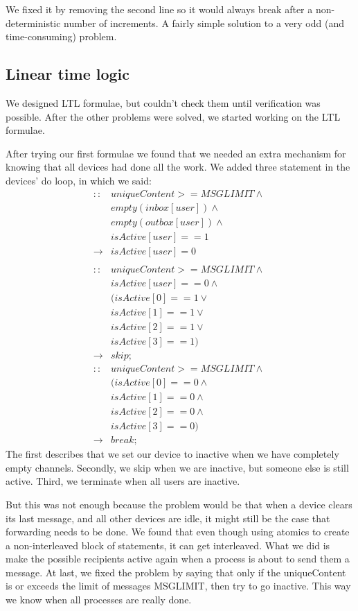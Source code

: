 \documentclass[9pt,a4paper]{article}
\begin{document}
	We fixed it by removing the second line so it would always break after a non-deterministic number of increments. A fairly simple solution to a very odd (and time-consuming) problem.
	
	\subsection{Linear time logic}
	We designed LTL formulae, but couldn't check them until verification was possible.
	After the other problems were solved, we started working on the LTL formulae.
	
	After trying our first formulae we found that we needed an extra mechanism for knowing that all devices had done all the work.
	We added three statement in the devices' do loop, in which we said:
	\begin{align*}
	:: & uniqueContent >= MSGLIMIT \wedge\ \\
	   & empty(inbox[user]) \wedge\ \\
	   & empty(outbox[user]) \wedge\ \\
	   & isActive[user] == 1 \\
	\rightarrow & isActive[user] = 0 \\
	\\
	:: & uniqueContent >= MSGLIMIT \wedge\ \\
	   & isActive[user] == 0  \wedge\ \\ 
	   & (isActive[0] == 1 \vee\ \\ 
	   & isActive[1] == 1 \vee\ \\ 
	   & isActive[2] == 1 \vee\ \\
	   & isActive[3] == 1) \\
	\rightarrow & skip;
	\\
	::  & uniqueContent >= MSGLIMIT \wedge\ \\
	    & (isActive[0] == 0 \wedge\ \\ 
		& isActive[1] == 0 \wedge\ \\ 
		& isActive[2] == 0 \wedge\ \\
		& isActive[3] == 0) \\
		\rightarrow & break;
	\end{align*}
	The first describes that we set our device to inactive when we have completely empty channels.
	Secondly, we skip when we are inactive, but someone else is still active.
	Third, we terminate when all users are inactive.
	
	But this was not enough because the problem would be that when a device clears its last message, and all other devices are idle, it might still be the case that forwarding needs to be done.
	We  found that even though using atomics to create a non-interleaved block of statements, it can get interleaved.
	What we did is make the possible recipients active again when a process is about to send them a message.
	At last, we fixed the problem by saying that only if the uniqueContent is or exceeds the limit of messages MSGLIMIT, then try to go inactive.
	This way we know when all processes are really done.
	
\end{document}

